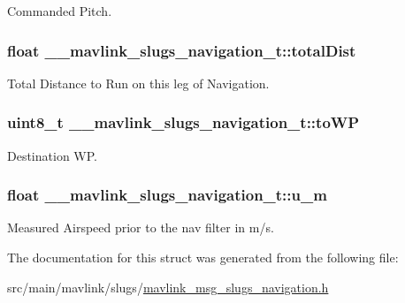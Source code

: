 Commanded Pitch. 

\hypertarget{struct____mavlink__slugs__navigation__t_aa7919499d2cfe0aeed224f25c04d549a}{
\subsubsection[{total\+Dist}]{\setlength{\rightskip}{0pt plus 5cm}float \+\_\+\+\_\+mavlink\+\_\+slugs\+\_\+navigation\+\_\+t\+::total\+Dist}}\label{struct____mavlink__slugs__navigation__t_aa7919499d2cfe0aeed224f25c04d549a}


Total Distance to Run on this leg of Navigation. 

\hypertarget{struct____mavlink__slugs__navigation__t_a4a3cf06f1705640c263d695c2bb71cd3}{
\subsubsection[{to\+W\+P}]{\setlength{\rightskip}{0pt plus 5cm}uint8\+\_\+t \+\_\+\+\_\+mavlink\+\_\+slugs\+\_\+navigation\+\_\+t\+::to\+W\+P}}\label{struct____mavlink__slugs__navigation__t_a4a3cf06f1705640c263d695c2bb71cd3}


Destination W\+P. 

\hypertarget{struct____mavlink__slugs__navigation__t_ab02b3924eade172ebf26b5c13808a5e7}{
\subsubsection[{u\+\_\+m}]{\setlength{\rightskip}{0pt plus 5cm}float \+\_\+\+\_\+mavlink\+\_\+slugs\+\_\+navigation\+\_\+t\+::u\+\_\+m}}\label{struct____mavlink__slugs__navigation__t_ab02b3924eade172ebf26b5c13808a5e7}


Measured Airspeed prior to the nav filter in m/s. 



The documentation for this struct was generated from the following file\+:\begin{DoxyCompactItemize}
\item 
src/main/mavlink/slugs/\hyperlink{mavlink__msg__slugs__navigation_8h}{mavlink\+\_\+msg\+\_\+slugs\+\_\+navigation.\+h}\end{DoxyCompactItemize}
